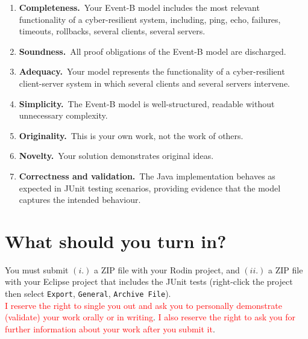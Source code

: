 \documentclass{article} %
\newcommand{\eb}{\textsf{Event-B}\xspace}
\begin{document}
\begin{enumerate}[leftmargin=*, label=(\textbf{\alph*}), itemsep=-5pt]
\item \textbf{Completeness.}~Your \eb model includes the most relevant functionality of a cyber-resilient system, including, ping, echo, failures, timeouts, rollbacks, several clients, several servers.
  \item \textbf{Soundness.}~All proof obligations of the \eb model are discharged.
  \item \textbf{Adequacy.}~Your model represents the functionality of a cyber-resilient
    client-server system in which several clients and several servers intervene.
  \item \textbf{Simplicity.}~The \eb model is well-structured, readable without unnecessary complexity. 
  \item \textbf{Originality.}~This is your own work, not the work of others. 
  \item \textbf{Novelty.}~Your solution demonstrates original ideas. 
  \item \textbf{Correctness and validation.}~The Java implementation behaves as expected in JUnit testing scenarios, providing evidence that the model captures the intended behaviour.
\end{enumerate}

\section*{What should you turn in?}
\label{sec_what_to_turnin}

You must submit $(i.)$ a ZIP file with your Rodin project, and $(ii.)$ a ZIP file with your
Eclipse project that includes the JUnit tests (right-click the project then select \texttt{Export},
\texttt{General}, \texttt{Archive File}).~\\

\smallskip
%
  \textcolor{red}{I reserve the right to single you out and ask you to
    personally demonstrate (validate) your work orally or in
    writing}. \textcolor{red}{I also reserve the right to ask you for
    further information about your work after you submit it}.
\end{document}
